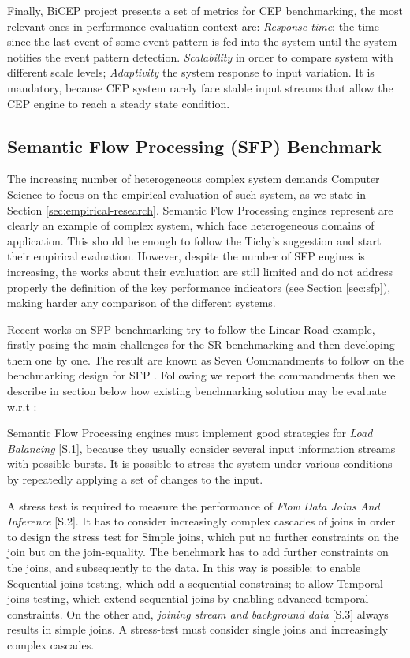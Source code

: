 Finally, BiCEP project presents a set of metrics for CEP benchmarking, the most relevant ones in performance evaluation context are: \textit{Response time}: the time since the last event of some event pattern is fed into the system until the system notifies the event pattern detection. \textit{Scalability} in order to compare system with different scale levels; \textit{Adaptivity} the system response to input variation. It is mandatory, because CEP system rarely face stable input streams that allow the CEP engine to reach a steady state condition.

\subsection{Semantic Flow Processing (SFP) Benchmark}\label{sec:sr-benchmarking}

The increasing number of heterogeneous complex system demands Computer Science to focus on the empirical evaluation of such system, as we state in Section \ref{sec:empirical-research}. Semantic Flow Processing engines represent are clearly an example of complex system, which face heterogeneous domains of application. This should be enough to follow the Tichy's suggestion and start their empirical evaluation. However, despite the number of SFP engines is increasing, the works about their evaluation are still limited and do not address properly the definition of the key performance indicators (see Section \ref{sec:sfp}), making harder any comparison of  the different systems.

Recent works on SFP benchmarking try to follow the Linear Road example, firstly posing the main challenges for the SR benchmarking  and then developing them one by one. The result are known as Seven Commandments to follow on the benchmarking design for SFP \cite{DBLP:conf/esws/ScharrenbachUMVB13}. Following we report the commandments then we describe in section below how existing benchmarking solution may be evaluate w.r.t \cite{DBLP:conf/esws/ScharrenbachUMVB13}:
 
Semantic Flow Processing engines must implement good strategies for \textit{Load Balancing} [S.1], because they usually consider several input information streams with possible bursts. It is possible to stress the system under various conditions by repeatedly applying a set of changes to the input.

A stress test is required to measure the performance of \textit{Flow Data Joins And Inference} [S.2]. It has to consider increasingly complex cascades of joins in order to design the stress test for Simple joins, which put no further constraints on the join but on the join-equality. The benchmark has to add further constraints on the joins, and subsequently to the data. In this way is possible: to enable Sequential joins testing, which add a sequential constrains;  to allow Temporal joins testing, which extend sequential joins by enabling advanced temporal constraints. On the other and, \textit{joining stream and background data} [S.3] always results in simple joins. A stress-test must consider single joins and increasingly complex cascades.

